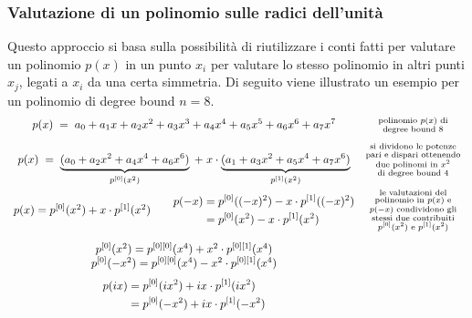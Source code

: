 \subsubsection*{Valutazione di un polinomio sulle radici dell'unità}
Questo approccio si basa sulla possibilità di riutilizzare i conti fatti per valutare un polinomio \(p(x)\) in un punto
\(x_i\) per valutare lo stesso polinomio in altri punti \(x_j\), legati a \(x_i\) da una certa simmetria. Di seguito viene
illustrato un esempio per un polinomio di degree bound \(n = 8\).
\[\begin{array}{c c}
	p(x) \; = \; a_0 + a_1 x + a_2 x^2 + a_3 x^3 + a_4 x^4 + a_5 x^5 + a_6 x^6 + a_7 x^7 & \substack{\text{polinomio } p(x) \text{ di} \\ \text{degree bound } 8} \\[10pt]
	p(x) \; = \; \underbrace{(a_0 + a_2 x^2 + a_4 x^4 + a_6 x^6)}_{p^{[0]}(x^2)} \; + \; x \cdot \underbrace{(a_1 + a_3 x^2 + a_5 x^4 + a_7 x^6)}_{p^{[1]}(x^2)} & \substack{\text{si dividono le potenze} \\ \text{pari e dispari ottenendo} \\ \text{due polinomi in } x^2 \\ \text{di degree bound } 4} \\[20pt]
	p(x) = p^{[0]}(x^2) + x \cdot p^{[1]}(x^2) \qquad \begin{aligned} p(-x) &= p^{[0]}((-x)^2) - x \cdot p^{[1]}((-x)^2) \\ &= p^{[0]}(x^2) - x \cdot p^{[1]}(x^2) \end{aligned} & \substack{\text{le valutazioni del} \\\text{polinomio in } p(x) \text{ e} \\ p(-x) \text{ condividono gli} \\ \text{stessi due contribuiti} \\ p^{[0]}(x^2) \text{ e } p^{[1]}(x^2)} \\[22pt]
	\begin{array}{c}
		p^{[0]}(x^2) = p^{[0][0]}(x^4) + x^2 \cdot p^{[0][1]}(x^4) \\
		p^{[0]}(-x^2) = p^{[0][0]}(x^4) - x^2 \cdot p^{[0][1]}(x^4) \\[7pt]
		\begin{aligned}
			p(ix) &= p^{[0]}({ix}^2) + ix \cdot p^{[1]}({ix}^2) \\ &= p^{[0]}(-x^2) + ix \cdot p^{[1]}(-x^2)
		\end{aligned}
	\end{array} \begin{array}{c}

\end{array}
\end{array}\]

